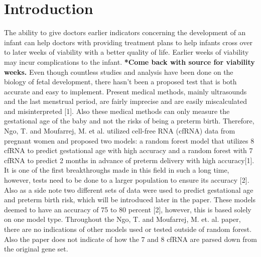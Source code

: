 \documentclass[]{llncs}
\begin{document}
\section{Introduction}
The ability to give doctors earlier indicators concerning the development of an infant can help doctors with providing treatment plans to help infants cross over to later weeks of viability with a better quality of life. Earlier weeks of viability may incur complications to the infant. \textbf{*Come back with source for viability weeks.}   Even though countless studies and analysis have been done on the biology of fetal development, there hasn't been a proposed test that is both accurate and easy to implement. Present medical methods, mainly ultrasounds and the last menstrual period, are fairly imprecise and are easily miscalculated and misinterpreted [1]. Also these medical methods can only measure the gestational age of the baby and not the risks of being a preterm birth.  Therefore, Ngo, T. and Moufarrej, M. et al. utilized cell-free RNA (cfRNA) data from pregnant women and proposed two models: a random forest model that utilizes 8 cfRNA  to predict gestational age with high accuracy and a random forest with 7 cfRNA to predict 2 months in advance of preterm delivery with high accuracy[1]. It is one of the first breakthroughs made in this field in such a long time, however, tests need to be done to a larger population to ensure its accuracy [2]. Also as a side note two different sets of data were used to predict gestational age and preterm birth risk, which will be introduced later in the paper. These models deemed to have an accuracy of 75 to 80 percent [2], however, this is based solely on one model type. Throughout the Ngo, T. and Moufarrej, M. et. al. paper, there are no indications of other models used or tested outside of random forest. Also the paper does not indicate of how the 7 and 8 cfRNA are parsed down from the original gene set.   
\end{document}
